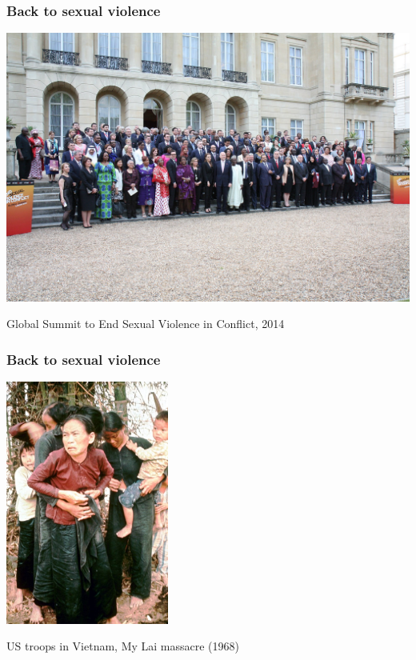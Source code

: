 \documentclass[utf8, xcolor=dvipsnames]{beamer}
\begin{document}
\begin{frame}
\frametitle{Back to sexual violence}
\centering

\includegraphics[width = \textwidth]{img/global_summit_rape}

Global Summit to End Sexual Violence in Conflict, 2014

\end{frame}


\begin{frame}
\frametitle{Back to sexual violence}
\centering

\includegraphics[width = 0.4\textwidth]{img/my_lai}

US troops in Vietnam, My Lai massacre (1968)

\end{frame}
\end{document}
